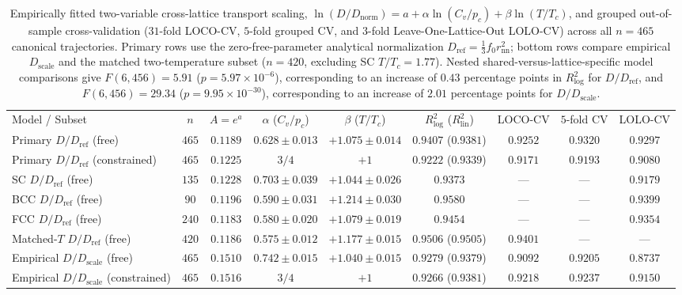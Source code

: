 \documentclass[aps,pre,reprint,superscriptaddress,amsmath,amssymb,floatfix]{revtex4-2}
\begin{document}
\begin{table}[t]
\caption{\label{tab:scaling_fits}Empirically fitted two-variable cross-lattice transport scaling, $\ln(D/D_{\mathrm{norm}}) = a + \alpha \ln(C_v/p_c) + \beta \ln(T/T_c)$, and grouped out-of-sample cross-validation ($31$-fold LOCO-CV, $5$-fold grouped CV, and $3$-fold Leave-One-Lattice-Out LOLO-CV) across all $n = 465$ canonical trajectories. Primary rows use the zero-free-parameter analytical normalization $D_{\mathrm{ref}} = \frac{1}{3}f_0 r_{\mathrm{nn}}^2$; bottom rows compare empirical $D_{\mathrm{scale}}$ and the matched two-temperature subset ($n = 420$, excluding SC $T/T_c = 1.77$). Nested shared-versus-lattice-specific model comparisons give $F(6,456)=5.91$ ($p=5.97\times10^{-6}$), corresponding to an increase of $0.43$ percentage points in $R^2_{\log}$ for $D/D_{\mathrm{ref}}$, and $F(6,456)=29.34$ ($p=9.95\times10^{-30}$), corresponding to an increase of $2.01$ percentage points for $D/D_{\mathrm{scale}}$.}
\begingroup
\footnotesize
\setlength{\tabcolsep}{3.5pt}
\begin{ruledtabular}
\begin{tabular}{lcccccccc}
Model / Subset & $n$ & $A = e^a$ & $\alpha$ ($C_v/p_c$) & $\beta$ ($T/T_c$) & $R^2_{\log}$ ($R^2_{\mathrm{lin}}$) & LOCO-CV & $5$-fold CV & LOLO-CV \\
\colrule
Primary $D/D_{\mathrm{ref}}$ (free) & $465$ & $0.1189$ & $0.628 \pm 0.013$ & $+1.075 \pm 0.014$ & $0.9407$ ($0.9381$) & $0.9252$ & $0.9320$ & $0.9297$ \\
Primary $D/D_{\mathrm{ref}}$ (constrained) & $465$ & $0.1225$ & $3/4$ & $+1$ & $0.9222$ ($0.9339$) & $0.9171$ & $0.9193$ & $0.9080$ \\
\colrule
SC $D/D_{\mathrm{ref}}$ (free)  & $135$ & $0.1228$ & $0.703 \pm 0.039$ & $+1.044 \pm 0.026$ & $0.9373$ & --- & --- & $0.9179$\footnotemark[1] \\
BCC $D/D_{\mathrm{ref}}$ (free) & $90$  & $0.1196$ & $0.590 \pm 0.031$ & $+1.214 \pm 0.030$ & $0.9580$ & --- & --- & $0.9399$\footnotemark[1] \\
FCC $D/D_{\mathrm{ref}}$ (free) & $240$ & $0.1183$ & $0.580 \pm 0.020$ & $+1.079 \pm 0.019$ & $0.9454$ & --- & --- & $0.9354$\footnotemark[1] \\
\colrule
Matched-$T$ $D/D_{\mathrm{ref}}$ (free) & $420$ & $0.1186$ & $0.575 \pm 0.012$ & $+1.177 \pm 0.015$ & $0.9506$ ($0.9505$) & $0.9401$ & --- & --- \\
Empirical $D/D_{\mathrm{scale}}$ (free) & $465$ & $0.1510$ & $0.742 \pm 0.015$ & $+1.040 \pm 0.015$ & $0.9279$ ($0.9379$) & $0.9092$ & $0.9205$ & $0.8737$ \\
Empirical $D/D_{\mathrm{scale}}$ (constrained) & $465$ & $0.1516$ & $3/4$ & $+1$ & $0.9266$ ($0.9381$) & $0.9218$ & $0.9237$ & $0.9150$ \\
\end{tabular}
\end{ruledtabular}
\endgroup
\end{table}
\end{document}
